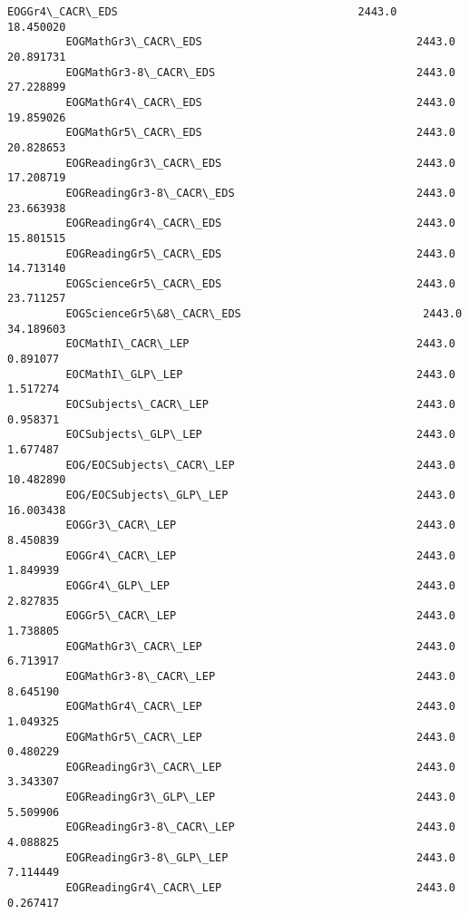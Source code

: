\documentclass[11pt]{article}
\begin{document}
\begin{Verbatim}[commandchars=\\\{\}]
         EOGGr4\_CACR\_EDS                                     2443.0      18.450020   
         EOGMathGr3\_CACR\_EDS                                 2443.0      20.891731   
         EOGMathGr3-8\_CACR\_EDS                               2443.0      27.228899   
         EOGMathGr4\_CACR\_EDS                                 2443.0      19.859026   
         EOGMathGr5\_CACR\_EDS                                 2443.0      20.828653   
         EOGReadingGr3\_CACR\_EDS                              2443.0      17.208719   
         EOGReadingGr3-8\_CACR\_EDS                            2443.0      23.663938   
         EOGReadingGr4\_CACR\_EDS                              2443.0      15.801515   
         EOGReadingGr5\_CACR\_EDS                              2443.0      14.713140   
         EOGScienceGr5\_CACR\_EDS                              2443.0      23.711257   
         EOGScienceGr5\&8\_CACR\_EDS                            2443.0      34.189603   
         EOCMathI\_CACR\_LEP                                   2443.0       0.891077   
         EOCMathI\_GLP\_LEP                                    2443.0       1.517274   
         EOCSubjects\_CACR\_LEP                                2443.0       0.958371   
         EOCSubjects\_GLP\_LEP                                 2443.0       1.677487   
         EOG/EOCSubjects\_CACR\_LEP                            2443.0      10.482890   
         EOG/EOCSubjects\_GLP\_LEP                             2443.0      16.003438   
         EOGGr3\_CACR\_LEP                                     2443.0       8.450839   
         EOGGr4\_CACR\_LEP                                     2443.0       1.849939   
         EOGGr4\_GLP\_LEP                                      2443.0       2.827835   
         EOGGr5\_CACR\_LEP                                     2443.0       1.738805   
         EOGMathGr3\_CACR\_LEP                                 2443.0       6.713917   
         EOGMathGr3-8\_CACR\_LEP                               2443.0       8.645190   
         EOGMathGr4\_CACR\_LEP                                 2443.0       1.049325   
         EOGMathGr5\_CACR\_LEP                                 2443.0       0.480229   
         EOGReadingGr3\_CACR\_LEP                              2443.0       3.343307   
         EOGReadingGr3\_GLP\_LEP                               2443.0       5.509906   
         EOGReadingGr3-8\_CACR\_LEP                            2443.0       4.088825   
         EOGReadingGr3-8\_GLP\_LEP                             2443.0       7.114449   
         EOGReadingGr4\_CACR\_LEP                              2443.0       0.267417   

\end{Verbatim}
\end{document}
